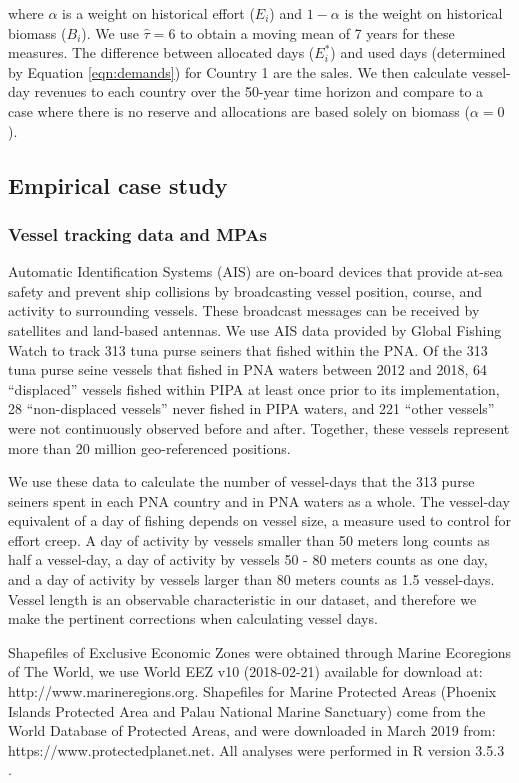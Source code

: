 \documentclass[12pt]{article}
\begin{document}
\noindent where $\alpha$ is a weight on historical effort ($E_i$) and $1-\alpha$ is the weight on historical biomass ($B_i$). We use $\hat{\tau}= 6$ to obtain a moving mean of 7 years for these measures. The difference between allocated days ($E_i^*$) and used days (determined by Equation \ref{eqn:demands}) for Country 1 are the sales. We then calculate vessel-day revenues to each country over the 50-year time horizon and compare to a case where there is no reserve and allocations are based solely on biomass ($\alpha = 0$).

\subsection{Empirical case study}

\subsubsection{Vessel tracking data and MPAs}

Automatic Identification Systems (AIS) are on-board devices that provide at-sea safety and prevent ship collisions by broadcasting vessel position, course, and activity to surrounding vessels. These broadcast messages can be received by satellites and land-based antennas. We use AIS data provided by Global Fishing Watch \cite{kroodsma_2018} to track 313 tuna purse seiners that fished within the PNA. Of the 313 tuna purse seine vessels that fished in PNA waters between 2012 and 2018, 64 ``displaced'' vessels fished within PIPA at least once prior to its implementation, 28 ``non-displaced vessels'' never fished in PIPA waters, and  221 ``other vessels'' were not continuously observed before and after. Together, these vessels represent more than 20 million geo-referenced positions.

We use these data to calculate the number of vessel-days that the 313 purse seiners spent in each PNA country and in PNA waters as a whole. The vessel-day equivalent of a day of fishing depends on vessel size, a measure used to control for effort creep. A day of activity by vessels smaller than 50 meters long counts as half a vessel-day, a day of activity by vessels 50 - 80 meters counts as one day, and a day of activity by vessels larger than 80 meters counts as 1.5 vessel-days. Vessel length is an observable characteristic in our dataset, and therefore we make the pertinent corrections when calculating vessel days.

Shapefiles of Exclusive Economic Zones were obtained through Marine Ecoregions of The World, we use World EEZ v10 (2018-02-21) available for download at: http://www.marineregions.org. Shapefiles for Marine Protected Areas (Phoenix Islands Protected Area and Palau National Marine Sanctuary) come from the World Database of Protected Areas, and were downloaded in March 2019 from: https://www.protectedplanet.net. All analyses were performed in R version 3.5.3 \cite{rcore_2018}.
\end{document}
